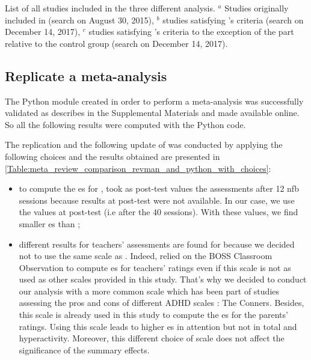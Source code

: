 \begin{table}[h!]
  \centering
  \caption{List of all studies included in the three different analysis. $^a$ Studies originally included in \citet{Cortese2016}
	(search on August 30, 2015), $^b$ studies satisfying \citet{Cortese2016}'s criteria (search on December 14, 2017), $^c$ studies 
	satisfying \citet{Cortese2016}'s criteria to the exception of the part relative to the control group (search on December 14, 2017).}
  
  \label{Table:table_factors_analysis_meta_analysis_list_studies}
\end{table}

\subsection{Replicate a meta-analysis}

The Python module created in order to perform a meta-analysis was successfully validated as describes in the Supplemental Materials and made available online.
So all the following results were computed with the Python code. 

The replication and the following update of \citeauthor{Cortese2016} was conducted by applying the following choices and the results obtained are presented 
in \cref{Table:meta_review_comparison_revman_and_python_with_choices}:

\begin{itemize}
    \item to compute the \gls{es} for \citet{Arnold2014}, \citet{Cortese2016} took as post-test values the assessments after 12 \gls{nfb} sessions
		because results at post-test were not available. In our case, we use the values at post-test (i.e after the 40 sessions). With these values, 
		we find smaller \gls{es} than \citet{Cortese2016};  
    \item different results for teachers' assessments are found for \cite{Steiner2014} because we decided not to use the same scale 
		as \citeauthor{Cortese2016}. Indeed, \citeauthor{Cortese2016} relied on the BOSS Classroom Observation \citep{Shapiro2010} to compute \gls{es}
		for teachers' ratings even if this scale is not as used as other scales provided in this study. That's why we decided to conduct our analysis
		with a more common scale which has been part of studies assessing the pros and cons of different ADHD scales \citep{Epstein2012, Collett2003}: The Conners. 
		Besides, this scale is already used in this study to compute the \gls{es} for the parents' ratings. 
		Using this scale leads to higher \gls{es} in attention but not in total and hyperactivity. Moreover, this different choice of 
		scale does not affect the significance of the summary effects.
\end{itemize}

